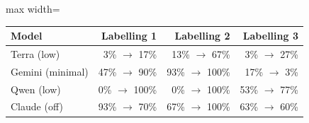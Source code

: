 \begin{adjustbox}{max width=\linewidth}
\begin{tabular}{@{}lrrr@{}}
\toprule
Model & Labelling 1 & Labelling 2 & Labelling 3 \\
\midrule
Terra (low) & 3\% $\to$ 17\% & 13\% $\to$ 67\% & 3\% $\to$ 27\% \\
Gemini (minimal) & 47\% $\to$ 90\% & 93\% $\to$ 100\% & 17\% $\to$ 3\% \\
Qwen (low) & 0\% $\to$ 100\% & 0\% $\to$ 100\% & 53\% $\to$ 77\% \\
Claude (off) & 93\% $\to$ 70\% & 67\% $\to$ 100\% & 63\% $\to$ 60\% \\
\bottomrule
\end{tabular}
\end{adjustbox}

\par{}
